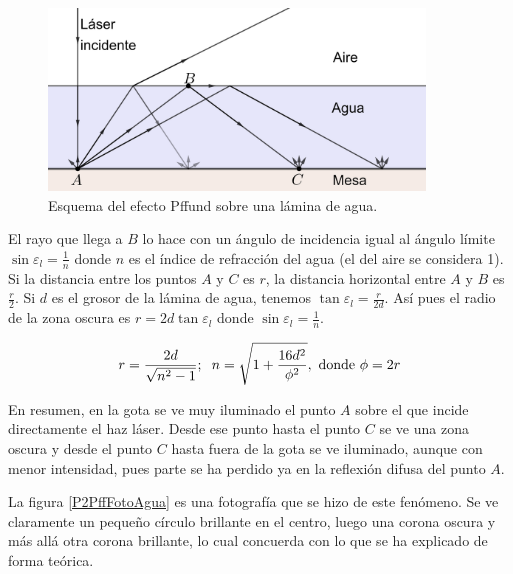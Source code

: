 \documentclass[12pt]{article}
\numberwithin{table}{section}
\numberwithin{figure}{section}
\numberwithin{equation}{section}
\DeclareMathOperator{\sen}{sin}
\begin{document}
\begin{figure}[!ht]
	\small \centering \sffamily
	\begin{center}
		\includegraphics[width=10cm]{P2PffAgua.png}
		\caption{Esquema del efecto Pffund sobre una lámina de agua.}
		\label{P2PffAgua}
	\end{center}
\end{figure}

El rayo que llega a $B$ lo hace con un ángulo de incidencia igual al ángulo límite $\sen\varepsilon_l=\frac{1}{n}$ donde $n$ es el índice de refracción del agua (el del aire se considera 1). Si la distancia entre los puntos $A$ y $C$ es $r$, la distancia horizontal entre $A$ y $B$ es $\frac{r}{2}$. Si $d$ es el grosor de la lámina de agua, tenemos $\tan\varepsilon_l=\frac{r}{2d}$. Así pues el radio de la zona oscura es $r=2d\tan\varepsilon_l$ donde $\sen\varepsilon_l=\frac{1}{n}$.

\begin{equation}\label{P2PffRadioParvo}
	r=\frac{2d}{\sqrt{n^2-1}};\hspace{2mm}n=\sqrt{1+\frac{16d^2}{\phi^2}},\text{ donde }\phi=2r
\end{equation}

En resumen, en la gota se ve muy iluminado el punto $A$ sobre el que incide directamente el haz láser. Desde ese punto hasta el punto $C$ se ve una zona oscura y desde el punto $C$ hasta fuera de la gota se ve iluminado, aunque con menor intensidad, pues parte se ha perdido ya en la reflexión difusa del punto $A$. 

La figura \ref{P2PffFotoAgua} es una fotografía que se hizo de este fenómeno. Se ve claramente un pequeño círculo brillante en el centro, luego una corona oscura y más allá otra corona brillante, lo cual concuerda con lo que se ha explicado de forma teórica.
\end{document}
